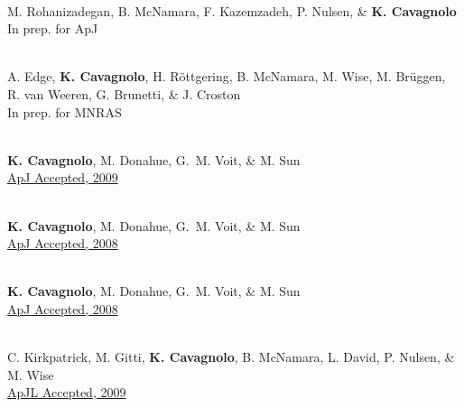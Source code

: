 \documentclass[11pt]{cv}
\begin{document}
\begin{llist}
{}\\
M. Rohanizadegan, B. McNamara, F. Kazemzadeh, P. Nulsen, \& {\bf K. Cavagnolo}\\
In prep. for ApJ

{}\\
A. Edge, {\bf{K. Cavagnolo}}, H. R\"ottgering, B. McNamara, M. Wise, M. Br\"uggen, R. van Weeren, G. Brunetti, \& J. Croston\\
In prep. for MNRAS



{}\\
{\bf K. Cavagnolo}, M. Donahue, G.~M. Voit, \& M. Sun\\
\href{http://adsabs.harvard.edu/abs/2009ApJS..182...12C}{ApJ Accepted, 2009}

{}\\
{\bf K. Cavagnolo}, M. Donahue, G.~M. Voit, \& M. Sun\\
\href{http://adsabs.harvard.edu/abs/2008ApJ...683L.107C}{ApJ Accepted, 2008}

{}\\
{\bf K. Cavagnolo}, M. Donahue, G.~M. Voit, \& M. Sun\\
\href{http://adsabs.harvard.edu/abs/2008ApJ...682..821C}{ApJ Accepted, 2008}



{}\\
C. Kirkpatrick, M. Gitti, {\bf K. Cavagnolo}, B. McNamara, L. David, P. Nulsen, \& M. Wise\\
\href{http://adsabs.harvard.edu/abs/2009arXiv0909.2252K}{ApJL Accepted, 2009}


\end{llist}
\end{document}
